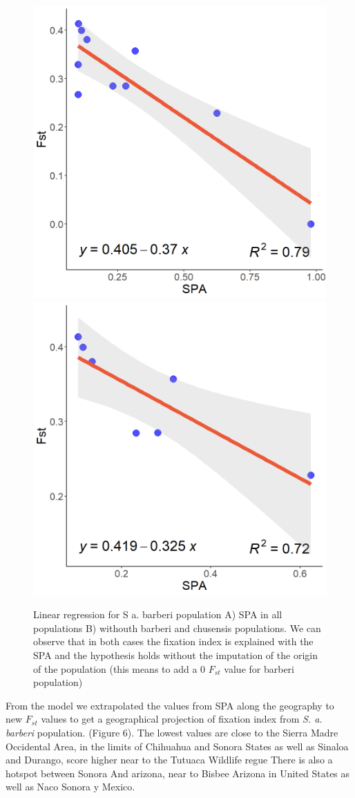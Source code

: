 \documentclass[
]{article}
\begin{document}
\begin{figure}
\includegraphics[width=0.5\linewidth]{all_figures/figure_5a} \includegraphics[width=0.5\linewidth]{all_figures/figure_5b} \caption{Linear regression for S a. barberi population A) SPA in all populations B) withouth barberi and chusensis populations. We can observe that in both cases the fixation index is explained with the SPA and the hypothesis holds without the imputation of the origin of the population (this means to add a 0 $F_{st}$ value for barberi population)}\label{fig:figures-side}
\end{figure}

From the model we extrapolated the values from SPA along the geography
to new \(F_{st}\) values to get a geographical projection of fixation
index from \emph{S. a. barberi} population. (Figure 6). The lowest
values are close to the Sierra Madre Occidental Area, in the limits of
Chihuahua and Sonora States as well as Sinaloa and Durango, score higher
near to the Tutuaca Wildlife regue There is also a hotspot between
Sonora And arizona, near to Bisbee Arizona in United States as well as
Naco Sonora y Mexico.
\end{document}
